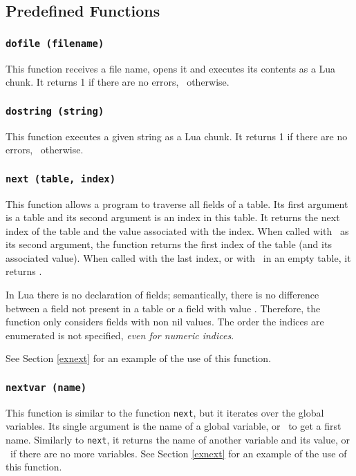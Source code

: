 \subsection{Predefined Functions}

\subsubsection*{{\tt dofile (filename)}}
This function receives a file name,
opens it and executes its contents as a Lua chunk.
It returns 1 if there are no errors, \nil\ otherwise.

\subsubsection*{{\tt dostring (string)}}
This function executes a given string as a Lua chunk.
It returns 1 if there are no errors, \nil\ otherwise.

\subsubsection*{{\tt next (table, index)}}
This function allows a program to traverse all fields of a table.
Its first argument is a table and its second argument
is an index in this table.
It returns the next index of the table and the
value associated with the index.
When called with \nil\ as its second argument,
the function returns the first index
of the table (and its associated value).
When called with the last index, or with \nil\ in an empty table,
it returns \nil.

In Lua there is no declaration of fields;
semantically, there is no difference between a
field not present in a table or a field with value \nil.
Therefore, the function only considers fields with non nil values.
The order the indices are enumerated is not specified,
{\em even for numeric indices}.

See Section \ref{exnext} for an example of the use of this function.

\subsubsection*{{\tt nextvar (name)}}
This function is similar to the function \verb'next',
but it iterates over the global variables.
Its single argument is the name of a global variable,
or \nil\ to get a first name.
Similarly to \verb'next', it returns the name of another variable
and its value,
or \nil\ if there are no more variables.
See Section \ref{exnext} for an example of the use of this function.

